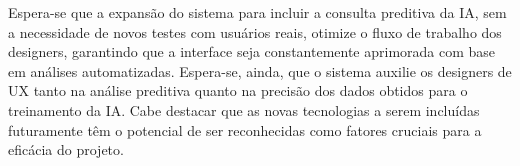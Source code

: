 Espera-se que a expansão do sistema para incluir a consulta preditiva da IA, sem a necessidade de novos testes com usuários reais, otimize o fluxo de trabalho dos designers, garantindo que a interface seja constantemente aprimorada com base em análises automatizadas. Espera-se, ainda, que o sistema auxilie os designers de UX tanto na análise preditiva quanto na precisão dos dados obtidos para o treinamento da IA. Cabe destacar que as novas tecnologias a serem incluídas futuramente têm o potencial de ser reconhecidas como fatores cruciais para a eficácia do projeto.